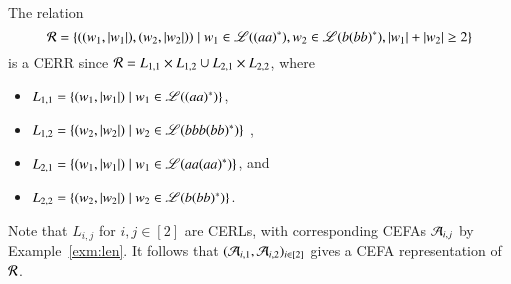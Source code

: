\begin{example}\label{exm:CERR}
The relation 
\[\mathcal{R}=\left\{((w_1, |w_1|), (w_2, |w_2|)) \mid  w_1 \in \mathscr{L}((aa)^*), w_2 \in \mathscr{L}(b(bb)^*), |w_1|+|w_2| \ge 2\right\}\] 
is a CERR since 
$\mathcal{R} = L_{1,1} \times L_{1,2} \cup L_{2,1} \times L_{2,2}$, where 
\begin{itemize}
\item $L_{1,1}=\{(w_1, |w_1|) \mid w_1 \in \mathscr{L}((aa)^*)\}$, 
\item $L_{1,2}=\{(w_2, |w_2|) \mid  w_2 \in \mathscr{L}(bbb(bb)^*)\}$ , 
\item $L_{2,1}=\{(w_1, |w_1|) \mid w_1 \in \mathscr{L}(aa(aa)^*)\}$,  and
\item $L_{2,2}=\{(w_2, |w_2|) \mid  w_2 \in \mathscr{L}(b(bb)^*)\}$. 
\end{itemize}
Note that $L_{i,j}$ for $i,j\in[2]$ are CERLs, with corresponding CEFAs $\mathcal{A}_{i,j}$ by  Example~\ref{exm:len}. It follows that %
$(\mathcal{A}_{i,1}, \mathcal{A}_{i,2})_{i \in [2]}$ gives a CEFA representation of $\mathcal{R}$. %
\end{example}

